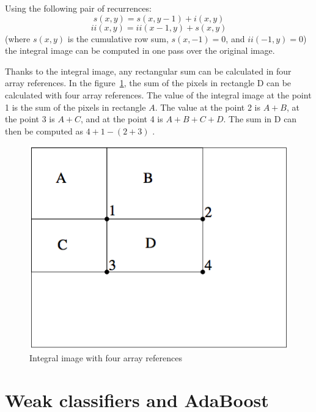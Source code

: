 \noindent Using the following pair of recurrences: 
\begin{equation}
s(x,y) = s(x,y - 1) + i(x,y)
\end{equation}
\begin{equation}
ii(x,y) = ii(x - 1,y) + s(x,y)
\end{equation}
(where $ s(x,y) $ is the cumulative row sum, $ s(x,-1) = 0 $, and $ ii(-1,y) = 0 $) the integral image can be computed in one pass over the original image. 
\newline

\noindent Thanks to the integral image, any rectangular sum can be calculated in four array references. In the figure~\ref{integral_image_four_array}, the sum of the pixels in rectangle D can be calculated with four array references. The value of the integral image at the point 1 is the sum of the pixels in rectangle $ A $. The value at the point 2 is $ A + B $, at the point 3 is $ A + C $, and at the point 4 is $ A + B + C + D $. The sum in D can then be computed as $ 4 + 1 - (2 + 3) $ \cite{VIO01}. 
\newline

\begin{figure}[!h]
\begin{center}
\noindent \includegraphics[scale=0.6]{figures/integral_image_four_array} 
\newline
\caption{Integral image with four array references}
\label{integral_image_four_array}
\end{center} 
\end{figure}

\section{Weak classifiers and AdaBoost}

